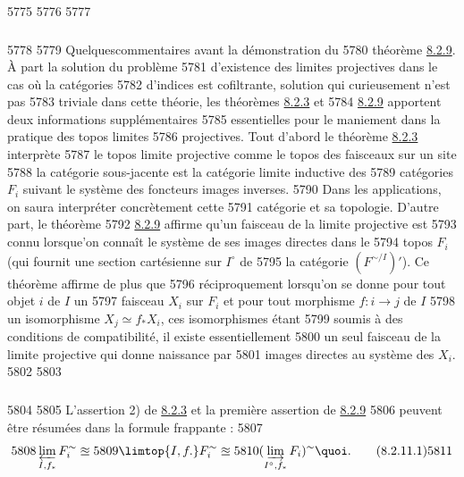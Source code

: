   5775	
  5776	\setcounter{subsubsection}{9}
  5777	\subsubsection{}
  5778	
  5779	Quelques\pageoriginale commentaires avant la démonstration du
  5780	théorème \hyperref[VI.thm8.2.9]{8.2.9}. À part la solution du problème
  5781	d'existence des limites projectives dans le cas où la catégories
  5782	d'indices est cofiltrante, solution qui curieusement n'est pas
  5783	triviale dans cette théorie, les théorèmes \hyperref[VI.thm8.2.3]{8.2.3} et
  5784	\hyperref[VI.thm8.2.9]{8.2.9} apportent deux informations supplémentaires
  5785	essentielles pour le maniement dans la pratique des topos limites
  5786	projectives. Tout d'abord le théorème \hyperref[VI.thm8.2.3]{8.2.3} interprète
  5787	le topos limite projective comme le topos des faisceaux sur un site
  5788	 la catégorie sous-jacente est la catégorie limite inductive des
  5789	catégories $F_i$ suivant le système des foncteurs images inverses.
  5790	Dans les applications, on saura interpréter concrètement cette
  5791	catégorie et sa topologie. D'autre part, le théorème
  5792	\hyperref[VI.thm8.2.9]{8.2.9} affirme qu'un faisceau de la limite projective est
  5793	connu lorsque'on connaît le système de ses images directes dans le
  5794	topos $F_i$ (qui fournit une section cartésienne sur $I^{\circ}$ de
  5795	la catégorie $(F^{\sim/I})'$). Ce théorème affirme de plus que
  5796	réciproquement lorsqu'on se donne pour tout objet $i$ de $I$ un
  5797	faisceau $X_i$ sur $F_i$ et pour tout morphisme $f : i \to j$ de $I$
  5798	un isomorphisme $X_j \simeq f_{\ast} X_i$, ces isomorphismes étant
  5799	soumis à des conditions de compatibilité, il existe essentiellement
  5800	un seul faisceau de la limite projective qui donne naissance par
  5801	images directes au système des $X_i$.
  5802	
  5803	\subsubsection{}
  5804	
  5805	L'assertion 2) de \hyperref[VI.thm8.2.3]{8.2.3} et la première assertion de \hyperref[VI.thm8.2.9]{8.2.9}
  5806	peuvent être résumées dans la formule frappante :
  5807	\begin{equation*}
  5808	\varprojlim_{I, f_{\ast}}F_i^{\sim} \approxeq
  5809	\limtop{I, f.} F_i^{\sim} \approxeq
  5810	(\varinjlim_{I^{\circ}, f_{\ast}} F_i)^{\sim}{\quoi}. \tag{8.2.11.1}
  5811	\end{equation*}
